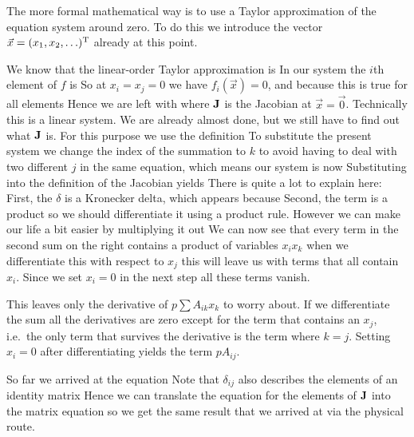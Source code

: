 The more formal mathematical way is to use a Taylor approximation of the equation system around zero. To do this we introduce the vector $\vec{x}=(x_1,x_2,\ldots)^{\rm T}$ already at this point. 

We know that the linear-order Taylor approximation is
In our system the $i$th element of $f$ is
So at $x_i=x_j=0$ we have $f_i(\vec{x})=0$, and because this is true for
all elements
Hence we are left with 
where $\bf J$ is the Jacobian at $\vec{x}=\vec{0}$. Technically this is a linear system. We are already almost done, but we still have to find out what $\bf J$ is. For this purpose we use the definition 
To substitute the present system we change the index of the summation to $k$ to avoid having to deal with two different $j$ in the same equation, which means our system is now
Substituting into the definition of the Jacobian yields
There is quite a lot to explain here: First, the $\delta$ is a Kronecker delta, which appears because 
Second, the term  
is a product so we should differentiate it using a product rule. However we can make our life a bit easier by multiplying it out 
We can now see that every term in the second sum on the right contains a product of variables $x_ix_k$ when we differentiate this with respect to $x_j$ this will leave us with terms that all contain $x_i$. Since we set $x_i=0$ in the next step all these terms vanish. 

This leaves only the derivative of $p\sum A_{ik} x_k$ to worry about. 
If we differentiate the sum all the derivatives are zero except for the term that contains an $x_j$, i.e.~the only term that survives the derivative is the term where $k=j$. Setting $x_i=0$ after differentiating yields the term $pA_{ij}$. 

So far we arrived at the equation 
Note that $\delta_{ij}$ also describes the elements of an identity matrix
Hence we can translate the equation for the elements of $\bf J$ into the matrix equation 
so we get the same result that we arrived at via the physical route.

